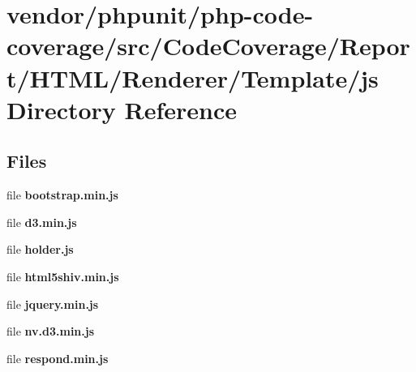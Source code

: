 \section{vendor/phpunit/php-\/code-\/coverage/src/\+Code\+Coverage/\+Report/\+H\+T\+M\+L/\+Renderer/\+Template/js Directory Reference}
\label{dir_fe7a7c8af5c20a23e40fbf9f49eb4fca}
\subsection*{Files}
\begin{DoxyCompactItemize}
\item 
file {\bf bootstrap.\+min.\+js}
\item 
file {\bf d3.\+min.\+js}
\item 
file {\bf holder.\+js}
\item 
file {\bf html5shiv.\+min.\+js}
\item 
file {\bf jquery.\+min.\+js}
\item 
file {\bf nv.\+d3.\+min.\+js}
\item 
file {\bf respond.\+min.\+js}
\end{DoxyCompactItemize}
